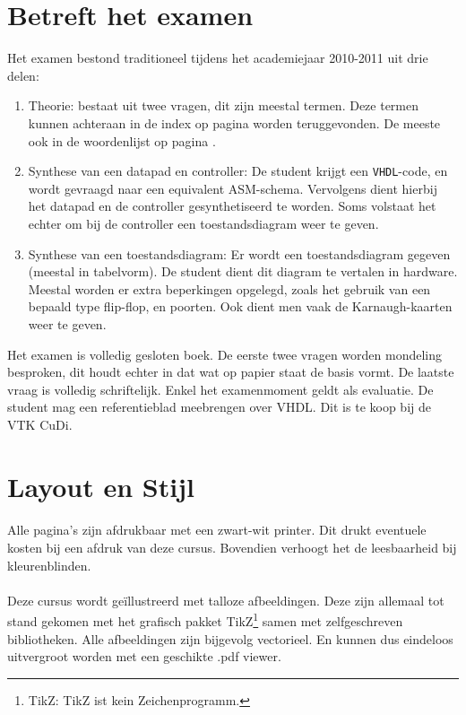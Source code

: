 \documentclass[a4paper,10pt,titlepage]{book}
\begin{document}
\begin{it}
\section*{Betreft het examen}
Het examen bestond traditioneel tijdens het academiejaar 2010-2011 uit drie delen:
\begin{enumerate}
 \item Theorie: bestaat uit twee vragen, dit zijn meestal termen. Deze termen kunnen achteraan in de index op pagina \pageref{idx} worden teruggevonden. De meeste ook in de woordenlijst op pagina \pageref{glos}.
 \item Synthese van een datapad en controller: De student krijgt een \texttt{VHDL}-code, en wordt gevraagd naar een equivalent ASM-schema. Vervolgens dient hierbij het datapad en de controller gesynthetiseerd te worden. Soms volstaat het echter om bij de controller een toestandsdiagram weer te geven.
 \item Synthese van een toestandsdiagram: Er wordt een toestandsdiagram gegeven (meestal in tabelvorm). De student dient dit diagram te vertalen in hardware. Meestal worden er extra beperkingen opgelegd, zoals het gebruik van een bepaald type flip-flop, en poorten. Ook dient men vaak de Karnaugh-kaarten weer te geven.
\end{enumerate}
Het examen is volledig gesloten boek. De eerste twee vragen worden mondeling besproken, dit houdt echter in dat wat op papier staat de basis vormt. De laatste vraag is volledig schriftelijk. Enkel het examenmoment geldt als evaluatie. De student mag een referentieblad meebrengen over VHDL. Dit is te koop bij de VTK CuDi.
\section*{Layout en Stijl}
\paragraph{}
Alle pagina's zijn afdrukbaar met een zwart-wit printer. Dit drukt eventuele kosten bij een afdruk van deze cursus. Bovendien verhoogt het de leesbaarheid bij kleurenblinden.
\paragraph{}
Deze cursus wordt ge\"illustreerd met talloze afbeeldingen. Deze zijn allemaal tot stand gekomen met het grafisch pakket TikZ\footnote{TikZ: TikZ ist kein Zeichenprogramm.} samen met zelfgeschreven bibliotheken. Alle afbeeldingen zijn bijgevolg vectorieel. En kunnen dus eindeloos uitvergroot worden met een geschikte .pdf viewer.

\end{it}
\end{document}
